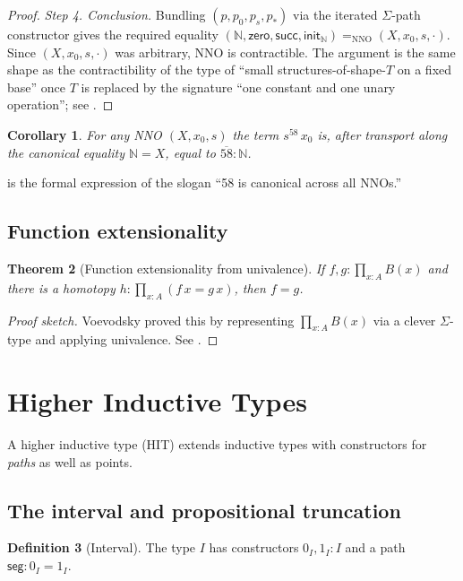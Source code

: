 \documentclass[12pt]{article}
\newtheorem{theorem}{Theorem}[section]
\newtheorem{corollary}[theorem]{Corollary}
\theoremstyle{definition}
\newtheorem{definition}[theorem]{Definition}
\theoremstyle{remark}
\newcommand{\N}{\mathbb{N}}
\newcommand{\zero}{\mathsf{zero}}
\newcommand{\suc}{\mathsf{succ}}
\begin{document}
\begin{proof}
\emph{Step 4. Conclusion.}
Bundling $(p, p_0, p_s, p_*)$ via the iterated $\Sigma$-path
constructor gives the required equality
$(\N, \zero, \suc, \mathsf{init}_\N) =_{\mathrm{NNO}} (X, x_0, s, \cdot)$.
Since $(X, x_0, s, \cdot)$ was arbitrary, $\mathrm{NNO}$ is contractible.
The argument is the same shape as the contractibility of the type of
``small structures-of-shape-$T$ on a fixed base'' once $T$ is replaced
by the signature ``one constant and one unary operation''; see
\cite[\S5.4 and \S2.7]{HoTTBook}.
\end{proof}

\begin{corollary}
\label{cor:58-canonical}
For any NNO $(X, x_0, s)$ the term $s^{58}\,x_0$ is, after transport along
the canonical equality $\N = X$, equal to $\overline{58} : \N$.
\end{corollary}

 is the formal expression of the slogan ``58 is
canonical across all NNOs.''

\subsection{Function extensionality}

\begin{theorem}[Function extensionality from univalence]
\label{thm:funext}
If $f, g : \prod_{x : A} B(x)$ and there is a homotopy
$h : \prod_{x : A} (f\,x = g\,x)$, then $f = g$.
\end{theorem}

\begin{proof}[Proof sketch]
Voevodsky proved this by representing $\prod_{x : A} B(x)$ via a clever
$\Sigma$-type and applying univalence. See \cite[\S4.9]{HoTTBook}.
\end{proof}

\section{Higher Inductive Types}
\label{sec:hits}

A higher inductive type (HIT) extends inductive types with constructors for
\emph{paths} as well as points.

\subsection{The interval and propositional truncation}

\begin{definition}[Interval]
The type $I$ has constructors $0_I, 1_I : I$ and a path
$\mathsf{seg} : 0_I = 1_I$.
\end{definition}
\end{document}

